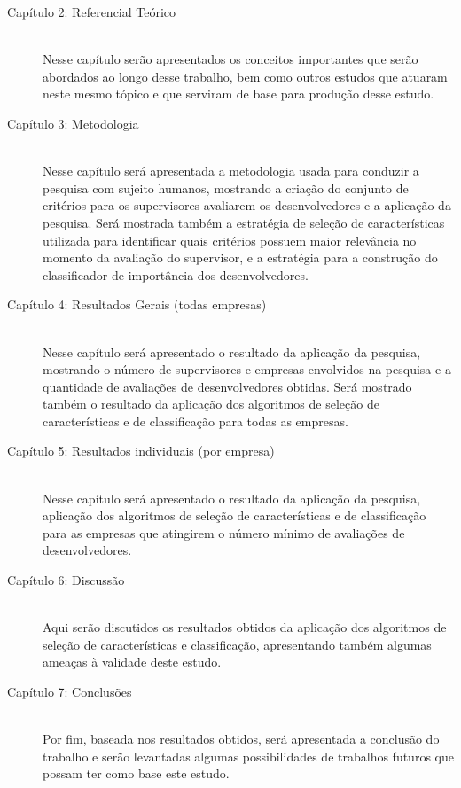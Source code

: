 \begin{description}
	\item[Capítulo 2: Referencial Teórico] \hfill \\
	Nesse capítulo serão apresentados os conceitos importantes que serão abordados ao longo desse trabalho, bem como outros estudos que atuaram neste mesmo tópico e que serviram de base para produção desse estudo.
	
	\item [Capítulo 3: Metodologia] \hfill \\
	Nesse capítulo será apresentada a metodologia usada para conduzir a pesquisa com sujeito humanos, mostrando a criação do conjunto de critérios para os supervisores avaliarem os desenvolvedores e a aplicação da pesquisa. Será mostrada também a estratégia de seleção de características utilizada para identificar quais critérios possuem maior relevância no momento da avaliação do supervisor, e a estratégia para a construção do classificador de importância dos desenvolvedores.
	
	\item[Capítulo 4: Resultados Gerais (todas empresas) ] \hfill \\
	Nesse capítulo será apresentado o resultado da aplicação da pesquisa, mostrando o número de supervisores e empresas envolvidos na pesquisa e a quantidade de avaliações de desenvolvedores obtidas. Será mostrado também o resultado da aplicação dos algoritmos de seleção de características e de classificação para todas as empresas.
	
	\item[Capítulo 5: Resultados individuais (por empresa) ] \hfill \\
	Nesse capítulo será apresentado o resultado da aplicação da pesquisa, aplicação dos algoritmos de seleção de características e de classificação para as empresas que atingirem o número mínimo de avaliações de desenvolvedores.
	
	\item[Capítulo 6: Discussão ] \hfill \\
	Aqui serão discutidos os resultados obtidos da aplicação dos algoritmos de seleção de características e classificação, apresentando também algumas ameaças à validade deste estudo.
	
	\item[Capítulo 7: Conclusões ] \hfill \\
	Por fim, baseada nos resultados obtidos, será apresentada a conclusão do trabalho e serão levantadas algumas possibilidades de trabalhos futuros que possam ter como base este estudo.
	
\end{description}

